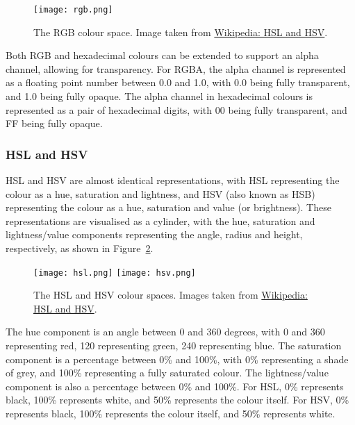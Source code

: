 \documentclass[../main.tex]{subfiles}
\begin{document}
                \begin{figure}[H]
                    \centering
                    \texttt{[image: rgb.png]}
                        \caption{The RGB colour space.
                            Image taken from \href{https://en.wikipedia.org/wiki/HSL_and_HSV}{Wikipedia:
                                    HSL and HSV}.
                        }
                        \label{fig:rgb}
                \end{figure}

                Both RGB and hexadecimal colours can be extended to support an alpha channel,
                    allowing for transparency.
                For RGBA, the alpha channel is represented as a floating point number between
                    0.0 and 1.0, with 0.0 being fully transparent, and 1.0 being fully opaque.
                The alpha channel in hexadecimal colours is represented as a pair of
                    hexadecimal digits, with 00 being fully transparent, and FF being fully opaque.

            \subsubsection{HSL and HSV}
                HSL and HSV are almost identical representations, with HSL representing the
                    colour as a hue, saturation and lightness, and HSV (also known as HSB)
                    representing the colour as a hue, saturation and value (or brightness).
                These representations are visualised as a cylinder, with the hue, saturation
                    and lightness/value components representing the angle, radius and height,
                    respectively, as shown in Figure~\ref{fig:hsl}.

                \begin{figure}[H]
                    \centering
                    \texttt{[image: hsl.png]}
                    \texttt{[image: hsv.png]}
                        \caption{The HSL and HSV colour spaces.
                            Images taken from \href{https://en.wikipedia.org/wiki/HSL_and_HSV}{Wikipedia:
                                    HSL and HSV}.
                        }
                        \label{fig:hsl}
                \end{figure}

                The hue component is an angle between 0 and 360 degrees, with 0 and 360
                    representing red, 120 representing green, 240 representing blue.
                The saturation component is a percentage between 0\% and 100\%, with 0\%
                    representing a shade of grey, and 100\% representing a fully saturated colour.
                The lightness/value component is also a percentage between 0\% and 100\%.
                For HSL, 0\% represents black, 100\% represents white, and 50\% represents the
                    colour itself.
                For HSV, 0\% represents black, 100\% represents the colour itself, and 50\%
                    represents white.
\end{document}
